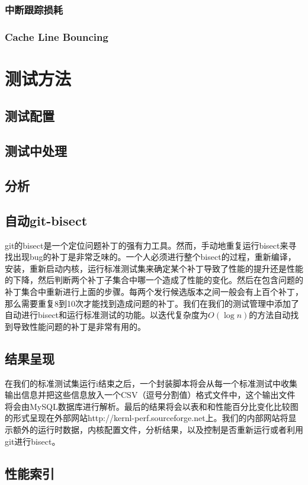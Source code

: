 \documentclass[CJK,12pt,a4paper]{article}
\begin{document}
\subsubsection{中断跟踪损耗}
\subsubsection{Cache Line Bouncing}
\section{测试方法}
\subsection{测试配置}
\subsection{测试中处理}
\subsection{分析}
\subsection{自动git-bisect}
git的bisect是一个定位问题补丁的强有力工具。然而，手动地重复运行bisect来寻找出现bug的补丁是非常乏味的。一个人必须进行整个bisect的过程，重新编译，安装，重新启动内核，运行标准测试集来确定某个补丁导致了性能的提升还是性能的下降，然后判断两个补丁子集合中哪一个造成了性能的变化。然后在包含问题的补丁集合中重新进行上面的步骤。每两个发行候选版本之间一般会有上百个补丁，那么需要重复8到10次才能找到造成问题的补丁。我们在我们的测试管理中添加了自动进行bisect和运行标准测试的功能。以迭代复杂度为$O(\log{n})$的方法自动找到导致性能问题的补丁是非常有用的。
\subsection{结果呈现}
在我们的标准测试集运行i结束之后，一个封装脚本将会从每一个标准测试中收集输出信息并把这些信息放入一个CSV（逗号分割值）格式文件中，这个输出文件将会由MySQL数据库进行解析。最后的结果将会以表和和性能百分比变化比较图的形式呈现在外部网站http://kernl-perf.sourceforge.net上。我们的内部网站将显示额外的运行时数据，内核配置文件，分析结果，以及控制是否重新运行或者利用git进行bisect。
\subsection{性能索引}
\end{document}
